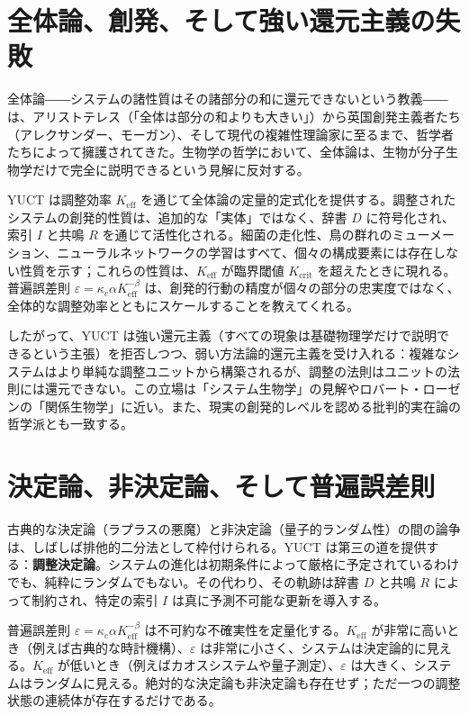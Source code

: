 \documentclass[12pt,a4paper]{article}
\begin{document}
	\section{全体論、創発、そして強い還元主義の失敗}
	
	全体論――システムの諸性質はその諸部分の和に還元できないという教義――は、アリストテレス（「全体は部分の和よりも大きい」）から英国創発主義者たち（アレクサンダー、モーガン）、そして現代の複雑性理論家に至るまで、哲学者たちによって擁護されてきた。生物学の哲学において、全体論は、生物が分子生物学だけで完全に説明できるという見解に反対する。
	
	YUCT は調整効率 \(K_{\mathrm{eff}}\) を通じて全体論の定量的定式化を提供する。調整されたシステムの創発的性質は、追加的な「実体」ではなく、辞書 \(D\) に符号化され、索引 \(I\) と共鳴 \(R\) を通じて活性化される。細菌の走化性、鳥の群れのミューメーション、ニューラルネットワークの学習はすべて、個々の構成要素には存在しない性質を示す；これらの性質は、\(K_{\mathrm{eff}}\) が臨界閾値 \(K_{\mathrm{crit}}\) を超えたときに現れる。普遍誤差則 \(\varepsilon = \kappa_c \alpha K_{\mathrm{eff}}^{-\beta}\) は、創発的行動の精度が個々の部分の忠実度ではなく、全体的な調整効率とともにスケールすることを教えてくれる。
	
	したがって、YUCT は強い還元主義（すべての現象は基礎物理学だけで説明できるという主張）を拒否しつつ、弱い方法論的還元主義を受け入れる：複雑なシステムはより単純な調整ユニットから構築されるが、調整の法則はユニットの法則には還元できない。この立場は「システム生物学」の見解やロバート・ローゼンの「関係生物学」に近い。また、現実の創発的レベルを認める批判的実在論の哲学派とも一致する。
	
	\section{決定論、非決定論、そして普遍誤差則}
	
	古典的な決定論（ラプラスの悪魔）と非決定論（量子的ランダム性）の間の論争は、しばしば排他的二分法として枠付けられる。YUCT は第三の道を提供する：\textbf{調整決定論}。システムの進化は初期条件によって厳格に予定されているわけでも、純粋にランダムでもない。その代わり、その軌跡は辞書 \(D\) と共鳴 \(R\) によって制約され、特定の索引 \(I\) は真に予測不可能な更新を導入する。
	
	普遍誤差則 \(\varepsilon = \kappa_c \alpha K_{\mathrm{eff}}^{-\beta}\) は不可約な不確実性を定量化する。\(K_{\mathrm{eff}}\) が非常に高いとき（例えば古典的な時計機構）、\(\varepsilon\) は非常に小さく、システムは決定論的に見える。\(K_{\mathrm{eff}}\) が低いとき（例えばカオスシステムや量子測定）、\(\varepsilon\) は大きく、システムはランダムに見える。絶対的な決定論も非決定論も存在せず；ただ一つの調整状態の連続体が存在するだけである。
	
\end{document}
